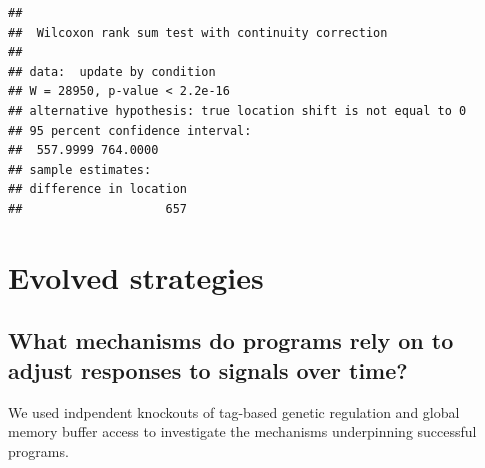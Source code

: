 \documentclass[
]{book}
\begin{document}
\begin{verbatim}
## 
##  Wilcoxon rank sum test with continuity correction
## 
## data:  update by condition
## W = 28950, p-value < 2.2e-16
## alternative hypothesis: true location shift is not equal to 0
## 95 percent confidence interval:
##  557.9999 764.0000
## sample estimates:
## difference in location 
##                    657
\end{verbatim}

\hypertarget{evolved-strategies}{%
\section{Evolved strategies}\label{evolved-strategies}}

\hypertarget{what-mechanisms-do-programs-rely-on-to-adjust-responses-to-signals-over-time}{%
\subsection{What mechanisms do programs rely on to adjust responses to signals over time?}\label{what-mechanisms-do-programs-rely-on-to-adjust-responses-to-signals-over-time}}

We used indpendent knockouts of tag-based genetic regulation and global memory buffer access to investigate the mechanisms underpinning successful programs.
\end{document}
